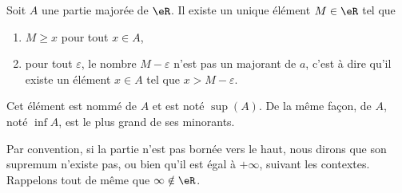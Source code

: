 \begin{propositionDef}		\label{DefSupeA}
    Soit $A$ une partie majorée de $\eR$. Il existe un unique élément \( M\in \eR\) tel que
    \begin{enumerate}
        \item
            $M\geq x$ pour tout $x\in A$,
        \item
            pour tout $\varepsilon$, le nombre $M-\varepsilon$ n'est pas un majorant de $a$, c'est à dire qu'il existe un élément $x\in A$ tel que $x>M-\varepsilon$.
    \end{enumerate}

    Cet élément est nommé  de $A$ et est noté \( \sup(A)\). De la même façon,  de $A$, noté $\inf A$, est le plus grand de ses minorants.
\end{propositionDef}

Par convention, si la partie n'est pas bornée vers le haut, nous dirons que son supremum n'existe pas, ou bien qu'il est égal à $+\infty$, suivant les contextes. Rappelons tout de même que $\infty\notin\eR$.

